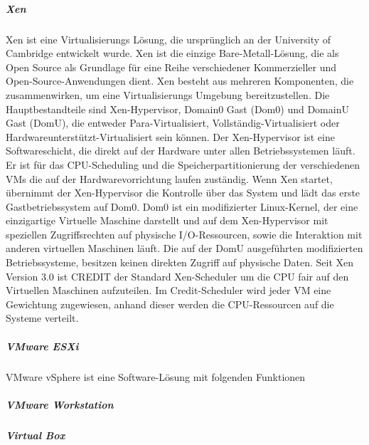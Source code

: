 \subparagraph {Xen}
Xen ist eine Virtualisierungs Lösung, die ursprünglich an der University of Cambridge entwickelt wurde. Xen ist die einzige Bare-Metall-Lösung, die als Open Source als Grundlage für eine Reihe verschiedener Kommerzieller und Open-Source-Anwendungen dient. Xen besteht aus mehreren Komponenten, die zusammenwirken, um eine Virtualisierungs Umgebung bereitzustellen. Die Hauptbestandteile sind Xen-Hypervisor, Domain0 Gast (Dom0) und DomainU Gast (DomU), die entweder Para-Virtualisiert, Vollständig-Virtualisiert oder Hardwareunterstützt-Virtualisiert sein können. Der Xen-Hypervisor ist eine Softwareschicht, die direkt auf der Hardware unter allen Betriebssystemen läuft. Er ist für das CPU-Scheduling und die Speicherpartitionierung der verschiedenen VMs die auf der Hardwarevorrichtung laufen zuständig. Wenn Xen startet, übernimmt der Xen-Hypervisor die Kontrolle über das System und lädt das erste Gastbetriebssystem auf Dom0. Dom0 ist ein modifizierter Linux-Kernel, der eine einzigartige Virtuelle Maschine darstellt und auf dem Xen-Hypervisor mit speziellen Zugriffsrechten auf physische I/O-Ressourcen, sowie die Interaktion mit anderen virtuellen Maschinen läuft. Die auf der DomU ausgeführten modifizierten Betriebssysteme, besitzen keinen direkten Zugriff auf physische Daten. Seit Xen Version 3.0 ist CREDIT der Standard Xen-Scheduler um die CPU fair auf den Virtuellen Maschinen aufzuteilen. Im Credit-Scheduler wird jeder VM eine Gewichtung zugewiesen, anhand dieser werden die CPU-Ressourcen auf die Systeme verteilt\cite{Fayyad-Kazan2013BenchmarkingHypervisors}. 

\subparagraph {VMware ESXi \cite{Fayyad-Kazan2013BenchmarkingHypervisors}}
VMware vSphere ist eine Software-Lösung mit folgenden Funktionen


\subparagraph {VMware Workstation}
\subparagraph{Virtual Box}


